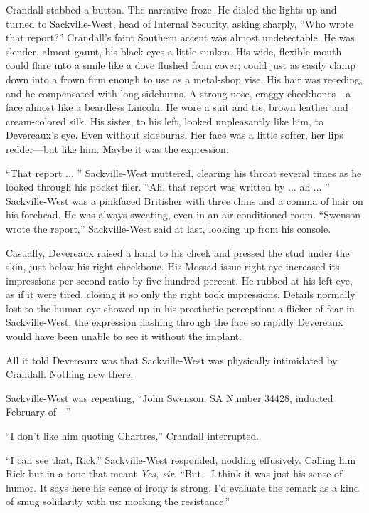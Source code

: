 Crandall stabbed a button. The narrative froze. He dialed the lights up and turned to Sackville-West, head of Internal Security, asking sharply, ``Who wrote that report?'' Crandall's faint Southern accent was almost undetectable. He was slender, almost gaunt, his black eyes a little sunken. His wide, flexible mouth could flare into a smile like a dove flushed from cover; could just as easily clamp down into a frown firm enough to use as a metal-shop vise. His hair was receding, and he compensated with long sideburns. A strong nose, craggy cheekbones---a face almost like a beardless Lincoln. He wore a suit and tie, brown leather and cream-colored silk. His sister, to his left, looked unpleasantly like him, to Devereaux's eye. Even without sideburns. Her face was a little softer, her lips redder---but like him. Maybe it was the expression.

``That report ... '' Sackville-West muttered, clearing his throat several times as he looked through his pocket filer. ``Ah, that report was written by ... ah ... '' Sackville-West was a pinkfaced Britisher with three chins and a comma of hair on his forehead. He was always sweating, even in an air-conditioned room. ``Swenson wrote the report,'' Sackville-West said at last, looking up from his console.

Casually, Devereaux raised a hand to his cheek and pressed the stud under the skin, just below his right cheekbone. His Mossad-issue right eye increased its impressions-per-second ratio by five hundred percent. He rubbed at his left eye, as if it were tired, closing it so only the right took impressions. Details normally lost to the human eye showed up in his prosthetic perception: a flicker of fear in Sackville-West, the expression flashing through the face so rapidly Devereaux would have been unable to see it without the implant.

All it told Devereaux was that Sackville-West was physically intimidated by Crandall. Nothing new there.

Sackville-West was repeating, ``John Swenson. SA Number 34428, inducted February of---''

``I don't like him quoting Chartres,'' Crandall interrupted.

``I can see that, Rick.'' Sackville-West responded, nodding effusively. Calling him Rick but in a tone that meant \textit{Yes, sir.} ``But---I think it was just his sense of humor. It says here his sense of irony is strong. I'd evaluate the remark as a kind of smug solidarity with us: mocking the resistance.''

